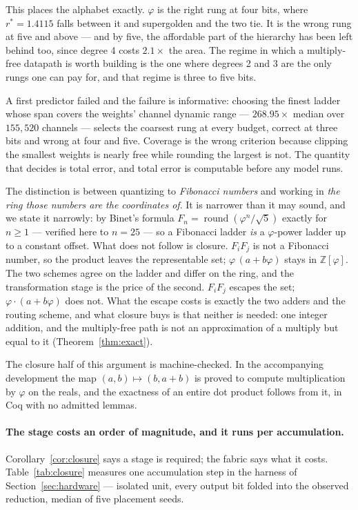 \documentclass[11pt]{article}
\theoremstyle{definition}
\begin{document}
This places the alphabet exactly. $\varphi$ is the right rung at four bits,
where $r^{*}=1.4115$ falls between it and supergolden and the two tie. It is the
wrong rung at five and above --- and by five, the affordable part of the
hierarchy has been left behind too, since degree 4 costs $2.1\times$ the area.
The regime in which a multiply-free datapath is worth building is the one where
degrees 2 and 3 are the only rungs one can pay for, and that regime is three to
five bits.

A first predictor failed and the failure is informative: choosing the finest
ladder whose span covers the weights' channel dynamic range --- $268.95\times$
median over $155{,}520$ channels --- selects the coarsest rung at every budget,
correct at three bits and wrong at four and five. Coverage is the wrong
criterion because clipping the smallest weights is nearly free while rounding
the largest is not. The quantity that decides is total error, and total error is
computable before any model runs.

The distinction is between quantizing to \emph{Fibonacci numbers} and working in
\emph{the ring those numbers are the coordinates of}. It is narrower than it may
sound, and we state it narrowly: by Binet's formula $F_n = \operatorname{round}
(\varphi^{n}/\sqrt5)$ exactly for $n \ge 1$ --- verified here to $n = 25$ --- so a
Fibonacci ladder \emph{is} a $\varphi$-power ladder up to a constant offset. What
does not follow is closure. $F_iF_j$ is not a Fibonacci number, so the product
leaves the representable set; $\varphi\,(a+b\varphi)$ stays in
$\mathbb{Z}[\varphi]$. The two schemes agree on the ladder and differ on the
ring, and the transformation stage is the price of the second. $F_iF_j$ escapes the set;
$\varphi\cdot(a+b\varphi)$ does not. What the escape costs is exactly the two
adders and the routing scheme, and what closure buys is that neither is needed:
one integer addition, and the multiply-free path is not an approximation of a
multiply but equal to it (Theorem~\ref{thm:exact}).

The closure half of this argument is machine-checked. In the accompanying
development the map $(a,b)\mapsto(b,a+b)$ is proved to compute multiplication by
$\varphi$ on the reals, and the exactness of an entire dot product follows from
it, in Coq with no admitted lemmas.

\paragraph{The stage costs an order of magnitude, and it runs per accumulation.}
Corollary~\ref{cor:closure} says a stage is required; the fabric says what it
costs. Table~\ref{tab:closure} measures one accumulation step in the harness of
Section~\ref{sec:hardware} --- isolated unit, every output bit folded into the
observed reduction, median of five placement seeds.
\end{document}
